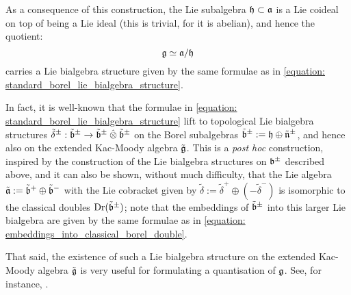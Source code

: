 As a consequence of this construction, the Lie subalgebra $\mathfrak{h} \subset \mathfrak{a}$ is a Lie coideal on top of being a Lie ideal (this is trivial, for it is abelian), and hence the quotient:
    $$\mathfrak{g} \simeq \mathfrak{a}/\mathfrak{h}$$
carries a Lie bialgebra structure given by the same formulae as in \eqref{equation: standard_borel_lie_bialgebra_structure}.
\begin{remark}
    In fact, it is well-known that the formulae in \eqref{equation: standard_borel_lie_bialgebra_structure} lift to topological Lie bialgebra structures $\tilde{\delta}^{\pm}: \tilde{\b}^{\pm} \to \tilde{\b}^{\pm} \hattensor \tilde{\b}^{\pm}$ on the Borel subalgebras $\tilde{\mathfrak{b}}^{\pm} := \mathfrak{h} \oplus \tilde{\mathfrak{n}}^{\pm}$, and hence also on the extended Kac-Moody algebra $\tilde{\mathfrak{g}}$. This is a \textit{post hoc} construction, inspired by the construction of the Lie bialgebra structures on $\mathfrak{b}^{\pm}$ described above, and it can also be shown, without much difficulty, that the Lie algebra $\tilde{\mathfrak{a}} := \tilde{\mathfrak{b}}^+ \oplus \tilde{\mathfrak{b}}^-$ with the Lie cobracket given by $\tilde{\delta} := \tilde{\delta}^+ \oplus (-\tilde{\delta}^-)$ is isomorphic to the classical doubles $\operatorname{Dr}(\tilde{\mathfrak{b}}^{\pm})$; note that the embeddings of $\tilde{\mathfrak{b}}^{\pm}$ into this larger Lie bialgebra are given by the same formulae as in \eqref{equation: embeddings_into_classical_borel_double}. 

    That said, the existence of such a Lie bialgebra structure on the extended Kac-Moody algebra $\tilde{\mathfrak{g}}$ is very useful for formulating a quantisation of $\mathfrak{g}$. See, for instance, \cite{etingof_kazhdan_quantisation_6}. 
\end{remark}